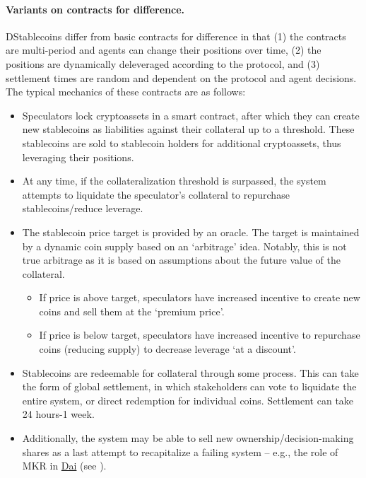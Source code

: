 \paragraph{Variants on contracts for difference.}
DStablecoins differ from basic contracts for difference in that (1) the contracts are multi-period and agents can change their positions over time, (2) the positions are dynamically deleveraged according to the protocol, and (3) settlement times are random and dependent on the protocol and agent decisions. The typical mechanics of these contracts are as follows:
\begin{itemize}
	\item Speculators lock cryptoassets in a smart contract, after which they can create new stablecoins as liabilities against their collateral up to a threshold. These stablecoins are sold to stablecoin holders for additional cryptoassets, thus leveraging their positions.
	
	\item At any time, if the collateralization threshold is surpassed, the system attempts to liquidate the speculator's collateral to repurchase stablecoins/reduce leverage.
	
	\item The stablecoin price target is provided by an oracle. The target is maintained by a dynamic coin supply based on an `arbitrage' idea. Notably, this is not true arbitrage as it is based on assumptions about the future value of the collateral.
	\begin{itemize}
		\item If price is above target, speculators have increased incentive to create new coins and sell them at the `premium price'.
		
		\item If price is below target, speculators have increased incentive to repurchase coins (reducing supply) to decrease leverage `at a discount'.
	\end{itemize}
	
	\item Stablecoins are redeemable for collateral through some process. This can take the form of global settlement, in which stakeholders can vote to liquidate the entire system, or direct redemption for individual coins. Settlement can take 24 hours-1 week.
	
	\item Additionally, the system may be able to sell new ownership/decision-making shares as a last attempt to recapitalize a failing system -- e.g., the role of MKR in \href{https://makerdao.com/dai}{Dai} (see \cite{dai_white2017}).
\end{itemize}


